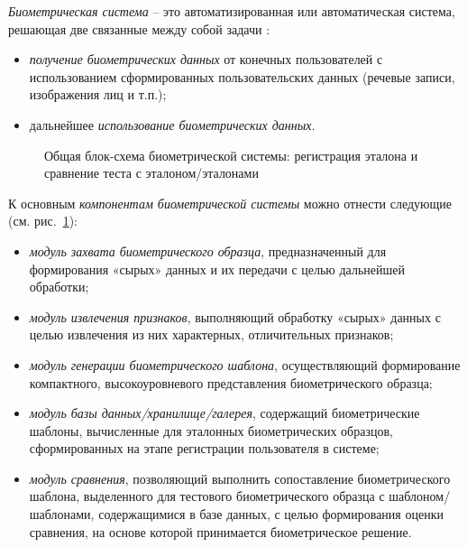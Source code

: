 \documentclass[12pt]{book}
\begin{document}
\large{\textit{Биометрическая система} -- это автоматизированная или автоматическая система, решающая две связанные между собой задачи \cite{kukharev_2013}: 

\begin{itemize}[topsep=1pt] \itemsep0.1em
\item \textit{получение биометрических данных} от конечных пользователей с использованием сформированных пользовательских данных (речевые записи, изображения лиц и т.п.);
\item дальнейшее \textit{использование биометрических данных}.
\end{itemize}

\begin{figure}[h]
\caption{Общая блок-схема биометрической системы: регистрация эталона и сравнение теста с эталоном/эталонами}
\label{fig:figure_1_1}
\end{figure}

К основным \textit{компонентам биометрической системы} можно отнести следующие (см. рис.~\ref{fig:figure_1_1}): 

\begin{itemize}[topsep=1pt] \itemsep0.1em
\item \textit{модуль захвата биометрического образца}, предназначенный для формирования «сырых» данных и их передачи с целью дальнейшей обработки;
\item \textit{модуль извлечения признаков}, выполняющий обработку «сырых» данных с целью извлечения из них характерных, отличительных признаков;
\item \textit{модуль генерации биометрического шаблона}, осуществляющий формирование компактного, высокоуровневого представления биометрического образца;
\item \textit{модуль базы данных/хранилище/галерея}, содержащий биометрические шаблоны, вычисленные для эталонных биометрических образцов, сформированных на этапе регистрации пользователя в системе;
\item \textit{модуль сравнения}, позволяющий выполнить сопоставление биометрического шаблона, выделенного для тестового биометрического образца с шаблоном/шаблонами, содержащимися в базе данных, с целью формирования оценки сравнения, на основе которой принимается биометрическое решение.
\end{itemize}

}
\end{document}
